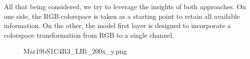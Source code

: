 All that being considered, we try to leverage the insights of both approaches. 
On one side, the RGB colorspace is taken as a starting point to retain all available information. On the other, the model first layer is designed to incorporate a colorspace transformation from RGB to a single channel.
\begin{figure}

    \centering
    Mar19bS1C4R3\_LHl\_200x\_y.png
    

\end{figure}
